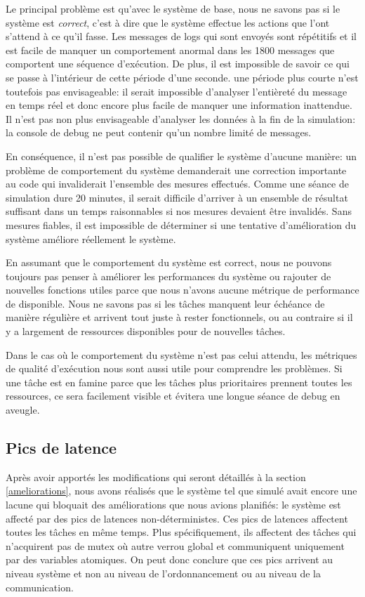 \documentclass[journal]{IEEEtran}
\begin{document}
Le principal problème est qu'avec le système de base, nous ne savons pas si le système est \emph{correct}, c'est à dire que le système effectue les actions que l'ont s'attend à ce qu'il fasse. Les messages de logs qui sont envoyés sont répétitifs et il est facile de manquer un comportement anormal dans les 1800 messages que comportent une séquence d'exécution. De plus, il est impossible de savoir ce qui se passe à l'intérieur de cette période d'une seconde. une période plus courte n'est toutefois pas envisageable: il serait impossible d'analyser l'entièreté du message en temps réel et donc encore plus facile de manquer une information inattendue. Il n'est pas non plus envisageable d'analyser les données à la fin de la simulation: la console de debug ne peut contenir qu'un nombre limité de messages.

En conséquence, il n'est pas possible de qualifier le système d'aucune manière: un problème de comportement du système demanderait une correction importante au code qui invaliderait l'ensemble des mesures effectués. Comme une séance de simulation dure 20 minutes, il serait difficile d'arriver à un ensemble de résultat suffisant dans un temps raisonnables si nos mesures devaient être invalidés. Sans mesures fiables, il est impossible de déterminer si une tentative d'amélioration du système améliore réellement le système.

En assumant que le comportement du système est correct, nous ne pouvons toujours pas penser à améliorer les performances du système ou rajouter de nouvelles fonctions utiles parce que nous n'avons aucune métrique de performance de disponible. Nous ne savons pas si les tâches manquent leur échéance de manière régulière et arrivent tout juste à rester fonctionnels, ou au contraire si il y a largement de ressources disponibles pour de nouvelles tâches.

Dans le cas où le comportement du système n'est pas celui attendu, les métriques de qualité d'exécution nous sont aussi utile pour comprendre les problèmes. Si une tâche est en famine parce que les tâches plus prioritaires prennent toutes les ressources, ce sera facilement visible et évitera une longue séance de debug en aveugle.

\subsection{Pics de latence}

Après avoir apportés les modifications qui seront détaillés à la section \ref{ameliorations}, nous avons réalisés que le système tel que simulé avait encore une lacune qui bloquait des améliorations que nous avions planifiés: le système est affecté par des pics de latences non-déterministes. Ces pics de latences affectent toutes les tâches en même temps. Plus spécifiquement, ils affectent des tâches qui n'acquirent pas de mutex où autre verrou global et communiquent uniquement par des variables atomiques. On peut donc conclure que ces pics arrivent au niveau système et non au niveau de l'ordonnancement ou au niveau de la communication. 
\end{document}
